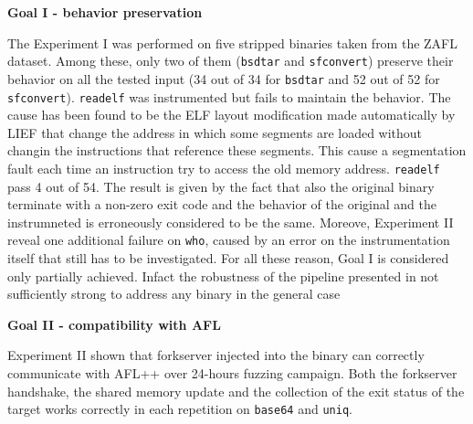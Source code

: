     \begin{center}
        \textbf{Goal I - behavior preservation}
    \end{center} 
    The Experiment I was performed on five stripped binaries taken from the ZAFL dataset.
    Among these, only two of them (\texttt{bsdtar} and \texttt{sfconvert}) preserve their behavior on all the tested 
    input (34 out of 34 for \texttt{bsdtar} and 52 out of 52 for \texttt{sfconvert}).
    \texttt{readelf} was instrumented but fails to maintain the behavior. The cause has been found to be the \gls{ELF} 
    layout modification made automatically by LIEF that change the address in which some segments are loaded without 
    changin the instructions that reference these segments.
    This cause a segmentation fault each time an instruction try to access the old memory address.
    \texttt{readelf} pass 4 out of 54. The result is given by the fact that also the original binary terminate with a non-zero 
    exit code and the behavior of the original and the instrumneted is erroneously considered to be the same.
    Moreove, Experiment II reveal one additional failure on \texttt{who}, caused by an error on the instrumentation itself 
    that still has to be investigated.
    For all these reason, Goal I is considered only partially achieved. Infact the robustness of the pipeline presented 
    in not sufficiently strong to address any binary in the general case

    \begin{center}
        \textbf{Goal II - compatibility with AFL}
    \end{center} 
    Experiment II shown that forkserver injected into the binary can correctly communicate with AFL++ over 24-hours 
    fuzzing campaign.
    Both the forkserver handshake, the shared memory update and the collection of the exit status of the target 
    works correctly in each repetition  on \texttt{base64} and \texttt{uniq}.

